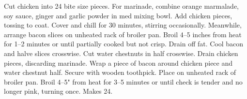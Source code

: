 \begin{minipage}{\linewidth}

\end{minipage}\par\begin{minipage}{\linewidth}  
{Cut chicken into 24 bite size pieces. For marinade, combine orange marmalade, soy sauce, ginger and garlic powder in med mixing bowl. Add chicken pieces, tossing to coat. Cover and chill for 30 minutes, stirring occasionally. Meanwhile, arrange bacon slices on unheated rack of broiler pan. Broil 4--5 inches from heat for 1--2 minutes or until partially cooked but not crisp. Drain off fat. Cool bacon and halve slices crosswise. Cut water chestnuts in half crosswise. Drain chicken pieces, discarding marinade. Wrap a piece of bacon around chicken piece and water chestnut half. Secure with wooden toothpick. Place on unheated rack of broiler pan. Broil 4--5" from heat for 3--5 minutes or until check is tender and no longer pink, turning once. Makes 24.}


\end{minipage}
